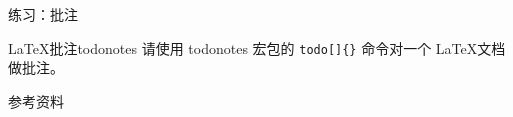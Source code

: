 \documentclass[final]{ctexbeamer}
\begin{document}
\begin{frame}[fragile]
\begin{vertlst}
\end{vertlst}
\end{frame}


\begin{frame}[fragile]{练习：批注}
\begin{Ex}{\LaTeX 批注}{todonotes}
请使用 todonotes 宏包的 \verb+todo[]{}+ 命令对一个 \LaTeX 文档做批注。
\end{Ex}
\end{frame}


\begin{frame}[allowframebreaks]{参考资料}
\printbibliography[heading=none]
\end{frame}
\end{document}
